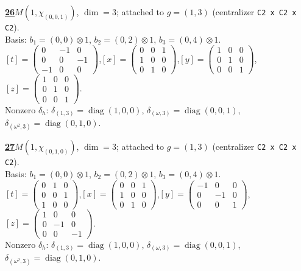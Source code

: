 \begin{samepage}\noindent\textbf{\underline{26}}\quad $M(1,\chi_{(0,0,1)})$, $\dim=3$; attached to $g=(1,3)$ (centralizer \texttt{C2 x C2 x C2}).\\
Basis: $b_{1}=(0,0)\otimes 1$, $b_{2}=(0,2)\otimes 1$, $b_{3}=(0,4)\otimes 1$.\\
$[t]=\left(\begin{smallmatrix} 0 & -1 & 0 \\ 0 & 0 & -1 \\ -1 & 0 & 0 \end{smallmatrix}\right)$,\quad $[x]=\left(\begin{smallmatrix} 0 & 0 & 1 \\ 1 & 0 & 0 \\ 0 & 1 & 0 \end{smallmatrix}\right)$,\quad $[y]=\left(\begin{smallmatrix} 1 & 0 & 0 \\ 0 & 1 & 0 \\ 0 & 0 & 1 \end{smallmatrix}\right)$,\quad $[z]=\left(\begin{smallmatrix} 1 & 0 & 0 \\ 0 & 1 & 0 \\ 0 & 0 & 1 \end{smallmatrix}\right)$.\\
Nonzero $\delta_h$: $\delta_{(1,3)}=\operatorname{diag}(1,0,0)$, $\delta_{(\omega,3)}=\operatorname{diag}(0,0,1)$, $\delta_{(\omega^2,3)}=\operatorname{diag}(0,1,0)$.\end{samepage}
\medskip

\begin{samepage}\noindent\textbf{\underline{27}}\quad $M(1,\chi_{(0,1,0)})$, $\dim=3$; attached to $g=(1,3)$ (centralizer \texttt{C2 x C2 x C2}).\\
Basis: $b_{1}=(0,0)\otimes 1$, $b_{2}=(0,2)\otimes 1$, $b_{3}=(0,4)\otimes 1$.\\
$[t]=\left(\begin{smallmatrix} 0 & 1 & 0 \\ 0 & 0 & 1 \\ 1 & 0 & 0 \end{smallmatrix}\right)$,\quad $[x]=\left(\begin{smallmatrix} 0 & 0 & 1 \\ 1 & 0 & 0 \\ 0 & 1 & 0 \end{smallmatrix}\right)$,\quad $[y]=\left(\begin{smallmatrix} -1 & 0 & 0 \\ 0 & -1 & 0 \\ 0 & 0 & 1 \end{smallmatrix}\right)$,\quad $[z]=\left(\begin{smallmatrix} 1 & 0 & 0 \\ 0 & -1 & 0 \\ 0 & 0 & -1 \end{smallmatrix}\right)$.\\
Nonzero $\delta_h$: $\delta_{(1,3)}=\operatorname{diag}(1,0,0)$, $\delta_{(\omega,3)}=\operatorname{diag}(0,0,1)$, $\delta_{(\omega^2,3)}=\operatorname{diag}(0,1,0)$.\end{samepage}
\medskip


